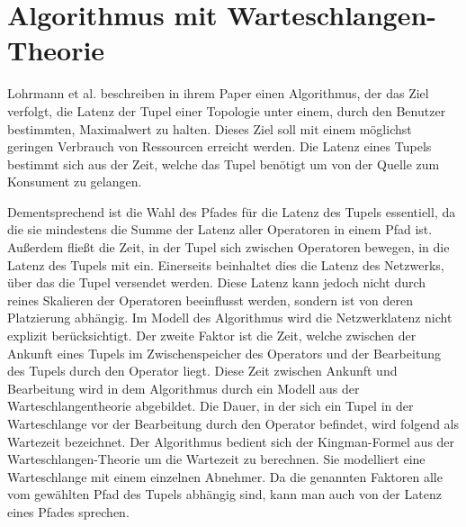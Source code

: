 \chapter{Algorithmus mit Warteschlangen-Theorie}

Lohrmann et al. beschreiben in ihrem Paper \cite{lohrmann_elastic_2015} einen Algorithmus, der das Ziel verfolgt, die Latenz der Tupel einer Topologie unter einem, durch den Benutzer bestimmten, Maximalwert zu halten.
Dieses Ziel soll mit einem möglichst geringen Verbrauch von Ressourcen erreicht werden.
Die Latenz eines Tupels bestimmt sich aus der Zeit, welche das Tupel benötigt um von der Quelle zum Konsument zu gelangen.

Dementsprechend ist die Wahl des Pfades für die Latenz des Tupels essentiell, da die sie mindestens die Summe der Latenz aller Operatoren in einem Pfad ist.
Außerdem fließt die Zeit, in der Tupel sich zwischen Operatoren bewegen, in die Latenz des Tupels mit ein.
Einerseits beinhaltet dies die Latenz des Netzwerks, über das die Tupel versendet werden.
Diese Latenz kann jedoch nicht durch reines Skalieren der Operatoren beeinflusst werden, sondern ist von deren Platzierung abhängig.
Im Modell des Algorithmus wird die Netzwerklatenz nicht explizit berücksichtigt.
Der zweite Faktor ist die Zeit, welche zwischen der Ankunft eines Tupels im Zwischenspeicher des Operators und der Bearbeitung des Tupels durch den Operator liegt.
Diese Zeit zwischen Ankunft und Bearbeitung wird in dem Algorithmus durch ein Modell aus der Warteschlangentheorie abgebildet.
Die Dauer, in der sich ein Tupel in der Warteschlange vor der Bearbeitung durch den Operator befindet, wird folgend als Wartezeit bezeichnet.
Der Algorithmus bedient sich der Kingman-Formel aus der Warteschlangen-Theorie um die Wartezeit zu berechnen.
Sie modelliert eine Warteschlange mit einem einzelnen Abnehmer.
Da die genannten Faktoren alle vom gewählten Pfad des Tupels abhängig sind, kann man auch von der Latenz eines Pfades sprechen.

